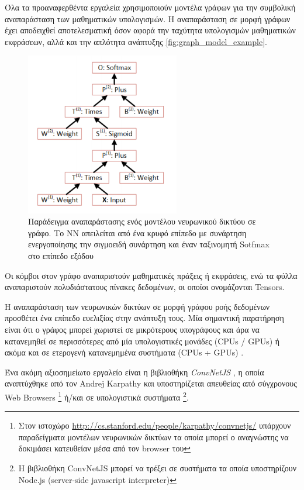 Όλα τα προαναφερθέντα εργαλεία χρησιμοποιούν μοντέλα γράφων
για την συμβολική αναπαράσταση των μαθηματικών υπολογισμών. Η αναπαράσταση σε μορφή γράφων
έχει αποδειχθεί αποτελεσματική όσον αφορά την ταχύτητα υπολογισμών μαθηματικών εκφράσεων, αλλά και την
απλότητα ανάπτυξης \autoref{fig:graph_model_example}.

\begin{figure}[!ht]
  \centering
  \includegraphics[width=0.6\textwidth]{./images/chapter4/graph_model_example.png}
  \caption[Παράδειγμα αναπαράστασης ενός μοντέλου νευρωνικού δικτύου σε γράφο.
    Το ΝΝ αποτλείται από ένα κρυφό επίπεδο
    και ένα ταξινομητή Sotfmax στο επίπεδο εξόδου]{
    Παράδειγμα αναπαράστασης ενός μοντέλου νευρωνικού δικτύου σε γράφο.
    Το ΝΝ απειλείται από ένα κρυφό επίπεδο με συνάρτηση ενεργοποίησης την σιγμοειδή συνάρτηση
    και έναν ταξινομητή Sotfmax στο επίπεδο εξόδου}
  \label{fig:graph_model_example}
\end{figure}
Οι κόμβοι στον γράφο αναπαριστούν μαθηματικές πράξεις ή εκφράσεις, ενώ τα φύλλα
αναπαριστούν πολυδιάστατους πίνακες δεδομένων, οι οποίοι ονομάζονται Tensors.

Η αναπαράσταση των νευρωνικών δικτύων σε μορφή γράφου ροής
δεδομένων προσθέτει ένα επίπεδο ευελιξίας στην ανάπτυξη τους. Μία σημαντική παρατήρηση
είναι ότι ο γράφος μπορεί χωριστεί σε μικρότερους υπογράφους και άρα να κατανεμηθεί
σε περισσότερες από μία υπολογιστικές μονάδες (CPUs / GPUs) ή ακόμα και
σε ετερογενή κατανεμημένα συστήματα (CPUs + GPUs) \cite{DBLP:journals/corr/AbadiABBCCCDDDG16} .

Ένα ακόμη αξιοσημείωτο εργαλείο είναι η βιβλιοθήκη \emph{ConvNetJS} \cite{karpathy2014convnetjs},
η οποία αναπτύχθηκε από τον Andrej Karpathy και υποστηρίζεται απευθείας από σύγχρονους
Web Browsers
\footnote{Στον ιστοχώρο \url{http://cs.stanford.edu/people/karpathy/convnetjs/}
υπάρχουν παραδείγματα μοντέλων νευρωνικών δικτύων τα οποία μπορεί ο αναγνώστης να δοκιμάσει
κατευθείαν μέσα από τον browser του}
ή/και σε υπολογιστικά συστήματα
\footnote{Η βιβλιοθήκη ConvNetJS μπορεί να τρέξει σε συστήματα τα οποία
υποστηρίζουν Node.js (server-side javascript interpreter)}.

